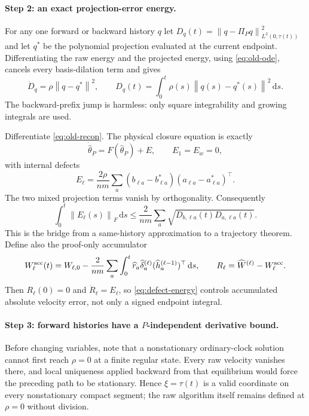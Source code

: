 \documentclass[11pt]{article}
\theoremstyle{definition}
\theoremstyle{remark}
\newcommand{\norm}[1]{\left\lVert #1\right\rVert}
\newcommand{\dd}{\,\mathrm{d}}
\begin{document}
\paragraph{Step 2: an exact projection-error energy.}
For any one forward or backward history $q$ let
$D_q(t)=\norm{q-\Pi_Pq}_{L^2(0,\tau(t))}^2$ and let $q^*$ be the polynomial
projection evaluated at the current endpoint.  Differentiating the raw energy
and the projected energy, using \eqref{eq:old-ode}, cancels every basis-dilation
term and gives
\begin{equation}
 \dot D_q=\rho\norm{q-q^*}^2,
 \qquad D_q(t)=\int_0^t\rho(s)\norm{q(s)-q^*(s)}^2\dd s. \label{eq:projection-energy}
\end{equation}
The backward-prefix jump is harmless: only square integrability and growing
integrals are used.

Differentiate \eqref{eq:old-recon}.  The physical closure equation is exactly
\begin{equation}
 \dot{\widehat\theta}_P=F(\widehat\theta_P)+E,\qquad E_1=E_w=0,
\end{equation}
with internal defects
\begin{equation}
 E_\ell=\frac{2\rho}{nm}\sum_a
 (b_{\ell a}-b_{\ell a}^*)(a_{\ell a}-a_{\ell a}^*)^\top. \label{eq:defect}
\end{equation}
The two mixed projection terms vanish by orthogonality.  Consequently
\begin{equation}
 \int_0^t\norm{E_\ell(s)}_F\dd s
 \le\frac{2}{nm}\sum_a\sqrt{D_{b,\ell a}(t)D_{a,\ell a}(t)}. \label{eq:defect-energy}
\end{equation}
This is the bridge from a same-history approximation to a trajectory theorem.
Define also the proof-only accumulator
\[
 W_{\ell}^{\rm acc}(t)=W_{\ell,0}
 -\frac{2}{nm}\sum_a\int_0^t
 \widehat r_a\widehat\delta_a^{(\ell)}
 (\widehat h_a^{(\ell-1)})^\top\dd s,\qquad
 R_\ell=\widehat W^{(\ell)}-W_\ell^{\rm acc}.
\]
Then $R_\ell(0)=0$ and $\dot R_\ell=E_\ell$, so
\eqref{eq:defect-energy} controls accumulated absolute velocity error, not
only a signed endpoint integral.

\paragraph{Step 3: forward histories have a $P$-independent derivative
bound.}
Before changing variables, note that a nonstationary ordinary-clock solution
cannot first reach $\rho=0$ at a finite regular state.  Every raw velocity
vanishes there, and local uniqueness applied backward from that equilibrium
would force the preceding path to be stationary.  Hence $\xi=\tau(t)$ is a
valid coordinate on every nonstationary compact segment; the raw algorithm
itself remains defined at $\rho=0$ without division.
\end{document}
